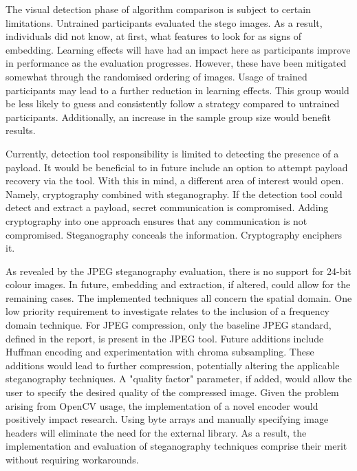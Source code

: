 \documentclass{l4proj}
\begin{document}
The visual detection phase of algorithm comparison is subject to certain limitations. Untrained participants evaluated the stego images. As a result, individuals did not know, at first, what features to look for as signs of embedding. Learning effects will have had an impact here as participants improve in performance as the evaluation progresses. However, these have been mitigated somewhat through the randomised ordering of images. Usage of trained participants may lead to a further reduction in learning effects. This group would be less likely to guess and consistently follow a strategy compared to untrained participants. Additionally, an increase in the sample group size would benefit results.

Currently, detection tool responsibility is limited to detecting the presence of a payload. It would be beneficial to in future include an option to attempt payload recovery via the tool. With this in mind, a different area of interest would open. Namely, cryptography combined with steganography. If the detection tool could detect and extract a payload, secret communication is compromised. Adding cryptography into one approach ensures that any communication is not compromised. Steganography conceals the information. Cryptography enciphers it.

As revealed by the JPEG steganography evaluation, there is no support for 24-bit colour images.  In future, embedding and extraction, if altered, could allow for the remaining cases. The implemented techniques all concern the spatial domain. One low priority requirement to investigate relates to the inclusion of a frequency domain technique. For JPEG compression, only the baseline JPEG standard, defined in the report, is present in the JPEG tool. Future additions include Huffman encoding and experimentation with chroma subsampling. These additions would lead to further compression, potentially altering the applicable steganography techniques. A "quality factor" parameter, if added, would allow the user to specify the desired quality of the compressed image. Given the problem arising from OpenCV usage, the implementation of a novel encoder would positively impact research. Using byte arrays and manually specifying image headers will eliminate the need for the external library. As a result, the implementation and evaluation of steganography techniques comprise their merit without requiring workarounds.

%
% 
\end{document}

